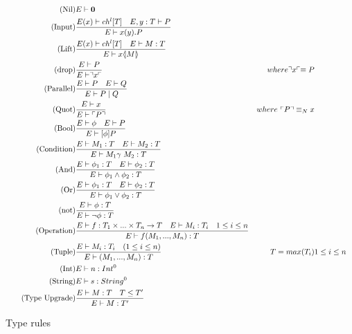 \begin{figure}
\begin{align}
\tag{Nil} &E \vdash \mathbf{0}\\
\tag{Input} &\frac{E(x) \vdash ch^l[T]\quad E,y:T\vdash P}{E \vdash x(y).P}\\
\tag{Lift} &\frac{E(x) \vdash ch^l[T] \quad E \vdash M:T}{E\vdash x \langle \! | M | \! \rangle}\\
\tag{drop} &\frac{E \vdash P}{E\vdash \urcorner x \ulcorner}& where \urcorner x \ulcorner \equiv P\\
\tag{Parallel} &\frac{E\vdash P \quad E \vdash Q}{E \vdash P \mid Q}\\
\tag{Quot} &\frac{E \vdash x}{E\vdash \ulcorner P \urcorner}& where\ \ulcorner P \urcorner \equiv_N x\\
\tag{Bool} &\frac{E\vdash \phi \quad E\vdash P}{E \vdash [\phi] P}\\
\tag{Condition} &\frac{E\vdash M_1:T \quad E\vdash M_2:T}{E\vdash M_1 \gamma\ M_2:T}\\
\tag{And} &\frac{E\vdash \phi _1:T \quad E\vdash \phi _2:T}{E\vdash \phi _1 \land \phi _2:T}\\
\tag{Or} &\frac{E\vdash \phi _1:T \quad E\vdash \phi _2:T}{E\vdash \phi _1 \lor \phi _2:T}\\
\tag{not} &\frac{E\vdash \phi :T }{E\vdash \neg \phi :T}\\
\tag{Operation} &\frac{E\vdash f:T_1\times ... \times T_n\rightarrow T\quad E\vdash M_i:T_i\quad 1\leq i \leq n}{E\vdash f(M_1,...,M_n):T}\\
\tag{Tuple} &\frac{E\vdash M_i:T_i \quad (1\leq i\leq n)}{E\vdash (M_1,...,M_n):T}&T = max(T_i)& 1\leq i\leq n\\
\tag{Int} &E\vdash n: Int^0\\
\tag{String} &E\vdash s:String^0\\
\tag{Type Upgrade} &\frac{E\vdash M:T \quad T\leq T'}{E\vdash M:T'}
\end{align}
\caption{Type rules}
\label{fig:typerules}
\end{figure}

%
%

\FloatBarrier
